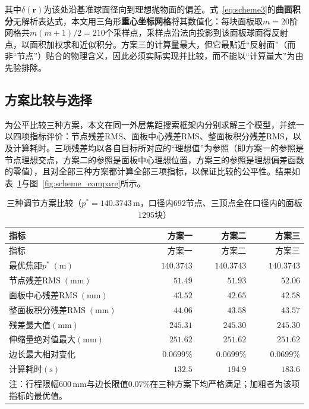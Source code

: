 \documentclass[withoutpreface]{cumcmthesis}
\begin{document}
其中$\delta(\mathbf{r})$为该处沿基准球面径向到理想抛物面的偏差。式~\eqref{eq:scheme3}的\textbf{曲面积分}无解析表达式，本文用三角形\textbf{重心坐标网格}将其数值化：每块面板取$m=20$阶网格共$m(m+1)/2=210$个采样点，采样点沿法向投影到该面板球面得反射点，以面积加权求和近似积分。方案三的计算量最大，但它最贴近``反射面''（而非``节点''）贴合的物理含义，因此必须实际实现并比较，而不能以``计算量大''为由先验排除。

\subsection{方案比较与选择}\label{sec:compare}

为公平比较三种方案，本文在同一外层焦距搜索框架内分别求解三个模型，并统一以四项指标评价：节点残差$\mathrm{RMS}$、面板中心残差$\mathrm{RMS}$、整面板积分残差$\mathrm{RMS}$，以及计算耗时。三项残差均以各自目标所对应的``理想值''为参照（即方案一的参照是节点理想交点，方案二的参照是面板中心理想位置，方案三的参照是理想偏差函数的零值），且对全部三种方案都计算全部三项指标，以保证比较的公平性。结果如表~\ref{tab:scheme_compare}与图~\ref{fig:scheme_compare}所示。

\begin{longtable}{p{3.5cm} r r r}
\caption{三种调节方案比较（$p^{*}=140.3743\,\mathrm{m}$，口径内$692$节点、三顶点全在口径内的面板$1295$块）} \label{tab:scheme_compare} \\
\toprule
指标 & 方案一 & 方案二 & 方案三 \\
\midrule
\endfirsthead
\toprule
指标 & 方案一 & 方案二 & 方案三 \\
\midrule
\endhead
\bottomrule
\endfoot
\bottomrule
\endlastfoot
最优焦距$p^{*}\;(\mathrm{m})$ & $140.3743$ & $140.3743$ & $140.3743$ \\
节点残差$\mathrm{RMS}\;(\mathrm{mm})$ & $\mathbf{51.49}$ & $51.93$ & $52.06$ \\
面板中心残差$\mathrm{RMS}\;(\mathrm{mm})$ & $43.52$ & $42.65$ & $\mathbf{42.58}$ \\
整面板积分残差$\mathrm{RMS}\;(\mathrm{mm})$ & $44.06$ & $43.58$ & $\mathbf{43.57}$ \\
残差最大值$(\mathrm{mm})$ & $245.31$ & $245.30$ & $245.30$ \\
伸缩量绝对值最大$(\mathrm{mm})$ & $251.62$ & $251.62$ & $251.62$ \\
边长最大相对变化 & $0.0699\%$ & $0.0699\%$ & $0.0699\%$ \\
计算耗时$(\mathrm{s})$ & $\mathbf{132.5}$ & $194.9$ & $183.6$ \\
\midrule
\multicolumn{4}{p{12.4cm}}{\small 注：行程限幅$600\,\mathrm{mm}$与边长限值$0.07\%$在三种方案下均严格满足；加粗者为该项指标的最优值。}\\
\bottomrule
\end{longtable}
\end{document}
